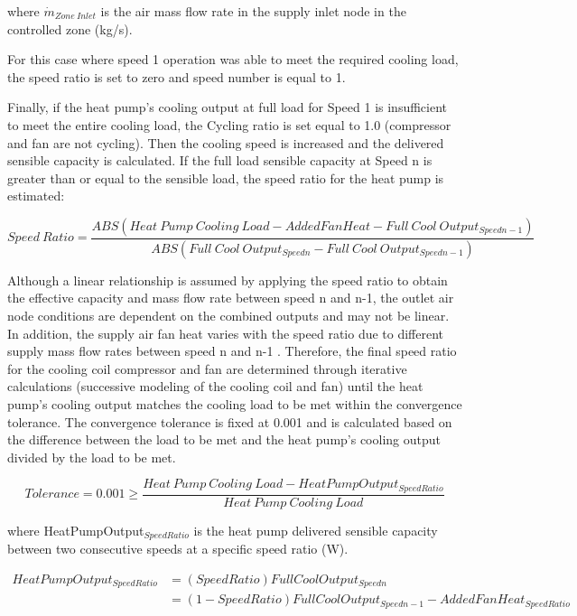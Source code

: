 where \({{{\dot m}_{Zone~Inlet}}}\) is the air mass flow rate in the supply inlet node in the controlled zone (kg/s).

For this case where speed 1 operation was able to meet the required cooling load, the speed ratio is set to zero and speed number is equal to 1.

Finally, if the heat pump's cooling output at full load for Speed 1 is insufficient to meet the entire cooling load, the Cycling ratio is set equal to 1.0 (compressor and fan are not cycling). Then the cooling speed is increased and the delivered sensible capacity is calculated. If the full load sensible capacity at Speed n is greater than or equal to the sensible load, the speed ratio for the heat pump is estimated:

\begin{equation}
Speed~Ratio = \frac{{ABS(Heat~Pump~Cooling~Load - AddedFanHeat - Full~Cool~ Outpu{t_{Speedn-1}})}}{{ABS(Full~Cool~Outpu{t_{Speedn}} - Full~Cool~Outpu{t_{Speedn-1}})}}
\end{equation}

Although a linear relationship is assumed by applying the speed ratio to obtain the effective capacity and mass flow rate between speed n and n-1, the outlet air node conditions are dependent on the combined outputs and may not be linear. In addition, the supply air fan heat varies with the speed ratio due to different supply mass flow rates between speed n and n-1 . Therefore, the final speed ratio for the cooling coil compressor and fan are determined through iterative calculations (successive modeling of the cooling coil and fan) until the heat pump's cooling output matches the cooling load to be met within the convergence tolerance. The convergence tolerance is fixed at 0.001 and is calculated based on the difference between the load to be met and the heat pump's cooling output divided by the load to be met.

\begin{equation}
Tolerance = 0.001 \ge \frac{{Heat~Pump~Cooling~Load - HeatPumpOutpu{t_{SpeedRatio}}}}{{Heat~Pump~Cooling~Load}}
\end{equation}

where HeatPumpOutput\(_{SpeedRatio}\) is the heat pump delivered sensible capacity between two consecutive speeds at a specific speed ratio (W).

\begin{equation}
\begin{array}{rl}
HeatPumpOutpu{t_{SpeedRatio}} & = (SpeedRatio)FullCoolOutpu{t_{Speedn}} \\
 & = (1 - SpeedRatio)FullCoolOutpu{t_{Speedn-1}} - AddedFanHea{t_{SpeedRatio}}
\end{array}
\end{equation}

